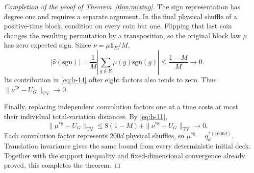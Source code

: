 \documentclass[11pt]{article}
\theoremstyle{remark}
\numberwithin{equation}{section}
\begin{document}
\begin{proof}[Completion of the proof of Theorem~\ref{thm:mixing}]
The sign representation has degree one and requires a separate argument. In the final physical shuffle of a positive-time block, condition on every coin but one. Flipping that last coin changes the resulting permutation by a transposition, so the original block law \(\mu\) has zero expected sign. Since \(\nu=\mu\mathbf1_E/M\),
\[
 |\widehat\nu(\mathrm{sgn})|
 =\frac1M\left|\sum_{g\notin E}\mu(g)\mathrm{sgn}(g)\right|
 \le\frac{1-M}{M}\longrightarrow0.
\]
Its contribution in \eqref{eq:h-14} after eight factors also tends to zero. Thus \(\|\nu^{*8}-U_G\|_{\mathrm{TV}}\to0\).

Finally, replacing independent convolution factors one at a time costs at most their individual total-variation distances. By \eqref{eq:h-11},
\[
 \|\mu^{*8}-U_G\|_{\mathrm{TV}}
 \le8(1-M)+\|\nu^{*8}-U_G\|_{\mathrm{TV}}
 \longrightarrow0.
\]
Each convolution factor represents \(200d\) physical shuffles, so \(\mu^{*8}=q_d^{*(1600d)}\). Translation invariance gives the same bound from every deterministic initial deck. Together with the support inequality and fixed-dimensional convergence already proved, this completes the theorem.
\end{proof}


\end{document}
